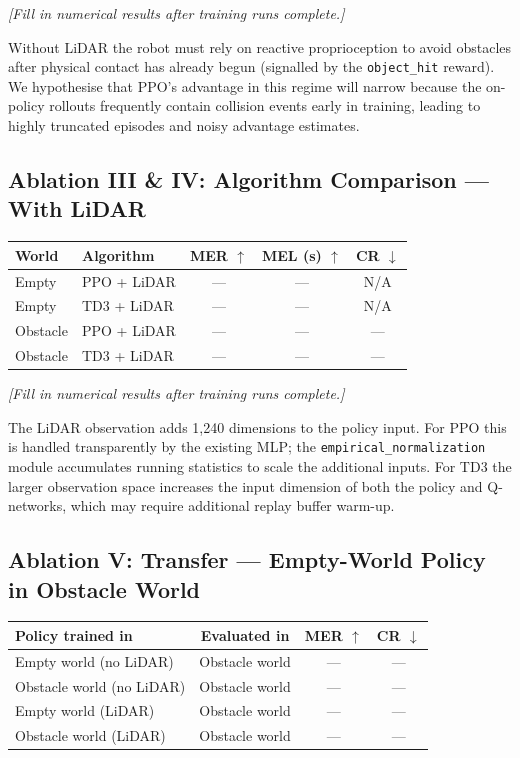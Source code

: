 \documentclass{article}
\begin{document}
\textit{[Fill in numerical results after training runs complete.]}

Without LiDAR the robot must rely on reactive proprioception to avoid
obstacles after physical contact has already begun (signalled by the
\texttt{object\_hit} reward).
We hypothesise that PPO's advantage in this regime will narrow because the
on-policy rollouts frequently contain collision events early in training,
leading to highly truncated episodes and noisy advantage estimates.

\subsection{Ablation III \& IV: Algorithm Comparison — With LiDAR}

\begin{center}
\begin{tabular}{llccc}
  \toprule
  \textbf{World} & \textbf{Algorithm} & \textbf{MER} $\uparrow$
    & \textbf{MEL (s)} $\uparrow$ & \textbf{CR} $\downarrow$ \\
  \midrule
  Empty    & PPO + LiDAR & --- & --- & N/A \\
  Empty    & TD3 + LiDAR & --- & --- & N/A \\
  Obstacle & PPO + LiDAR & --- & --- & --- \\
  Obstacle & TD3 + LiDAR & --- & --- & --- \\
  \bottomrule
\end{tabular}
\end{center}

\textit{[Fill in numerical results after training runs complete.]}

The LiDAR observation adds 1{,}240 dimensions to the policy input.
For PPO this is handled transparently by the existing MLP; the
\texttt{empirical\_normalization} module accumulates running statistics to
scale the additional inputs.
For TD3 the larger observation space increases the input dimension of both
the policy and Q-networks, which may require additional replay buffer
warm-up.

\subsection{Ablation V: Transfer — Empty-World Policy in Obstacle World}

\begin{center}
\begin{tabular}{lccc}
  \toprule
  \textbf{Policy trained in} & \textbf{Evaluated in} & \textbf{MER} $\uparrow$
    & \textbf{CR} $\downarrow$ \\
  \midrule
  Empty world (no LiDAR) & Obstacle world & --- & --- \\
  Obstacle world (no LiDAR) & Obstacle world & --- & --- \\
  Empty world (LiDAR) & Obstacle world & --- & --- \\
  Obstacle world (LiDAR) & Obstacle world & --- & --- \\
  \bottomrule
\end{tabular}
\end{center}
\end{document}

